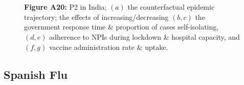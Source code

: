 \documentclass[paper=a4,fontsize=11pt]{article}
\begin{document}
\begin{figure}[!h]
  \\
  \hspace{1.76cm}
  \\
  \caption*{\textbf{Figure A20:} P2 in India; $(a)$ the counterfactual epidemic trajectory; the effects of increasing/decreasing $(b,c)$ the government response time \& proportion of cases self-isolating, $(d,e)$ adherence to NPIs during lockdown \& hospital capacity, and $(f,g)$ vaccine administration rate \& uptake.}
\end{figure}


\subsection{Spanish Flu}
\end{document}
